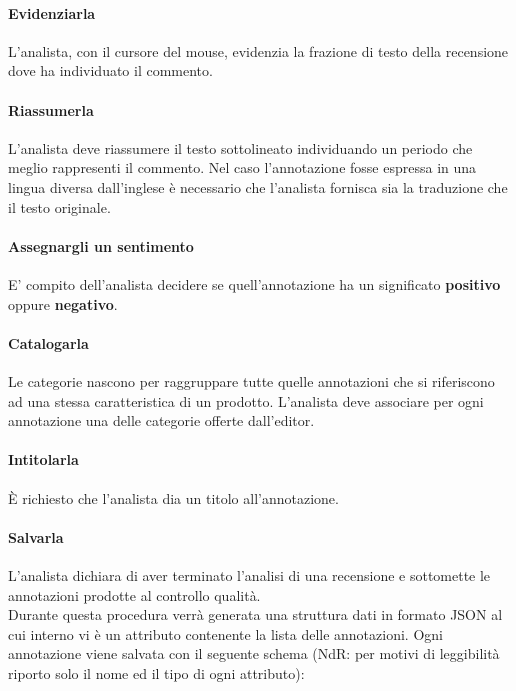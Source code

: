 \paragraph{Evidenziarla}
\label{evidenziarla}
L'analista, con il cursore del mouse, evidenzia la frazione di testo della
recensione dove ha individuato il commento.

\paragraph{Riassumerla}
\label{riassumerla}
L'analista deve riassumere il testo sottolineato individuando un periodo che
meglio rappresenti il commento. Nel caso l'annotazione fosse espressa in una
lingua diversa dall'inglese è necessario che l'analista fornisca sia la
traduzione che il testo originale.

\paragraph{Assegnargli un sentimento}
\label{sentimento}
E' compito dell'analista decidere se quell'annotazione ha un significato
\textbf{positivo} oppure \textbf{negativo}.

\paragraph{Catalogarla}
\label{catalogarla}
Le categorie nascono per raggruppare tutte quelle annotazioni che si
riferiscono ad una stessa caratteristica di un prodotto. L'analista deve
associare per ogni annotazione una delle categorie offerte dall'editor.

\paragraph{Intitolarla}
\label{intitolarla}
È richiesto che l'analista dia un titolo all'annotazione.

\paragraph{Salvarla}
\label{salvarla}
L'analista dichiara di aver terminato l'analisi di una recensione e sottomette
le annotazioni prodotte al controllo qualità. \\

Durante questa procedura verrà generata una struttura dati in formato \gls{JSON}
al cui interno vi è un attributo contenente la lista delle annotazioni. Ogni
annotazione viene salvata con il seguente schema (NdR: per motivi di leggibilità
riporto solo il nome ed il tipo di ogni attributo):

